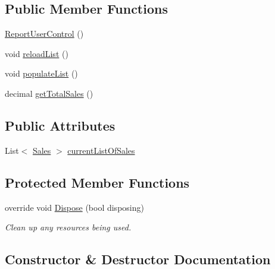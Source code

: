 \subsection*{Public Member Functions}
\begin{DoxyCompactItemize}
\item 
\hyperlink{class_health___assignment_1_1_report_user_control_aefef8ae1fbc7be9a852d0e7216019f73}{Report\+User\+Control} ()
\item 
void \hyperlink{class_health___assignment_1_1_report_user_control_a284d37f4544baf1b2796fe023d5d93f8}{reload\+List} ()
\item 
void \hyperlink{class_health___assignment_1_1_report_user_control_a6af39a17726dccbdcdafcaed038377fd}{populate\+List} ()
\item 
decimal \hyperlink{class_health___assignment_1_1_report_user_control_aa16985cdd6d11217c6fe43fac1fe2937}{get\+Total\+Sales} ()
\end{DoxyCompactItemize}
\subsection*{Public Attributes}
\begin{DoxyCompactItemize}
\item 
List$<$ \hyperlink{class_health___assignment_1_1_sales}{Sales} $>$ \hyperlink{class_health___assignment_1_1_report_user_control_a92c8cdc8c292090768dbfe442f7576ea}{current\+List\+Of\+Sales}
\end{DoxyCompactItemize}
\subsection*{Protected Member Functions}
\begin{DoxyCompactItemize}
\item 
override void \hyperlink{class_health___assignment_1_1_report_user_control_a7d504fe5255457a99cd6433431ab4e66}{Dispose} (bool disposing)
\begin{DoxyCompactList}\small\item\em Clean up any resources being used. \end{DoxyCompactList}\end{DoxyCompactItemize}


\subsection{Constructor \& Destructor Documentation}
\mbox{\label{class_health___assignment_1_1_report_user_control_aefef8ae1fbc7be9a852d0e7216019f73}} 
